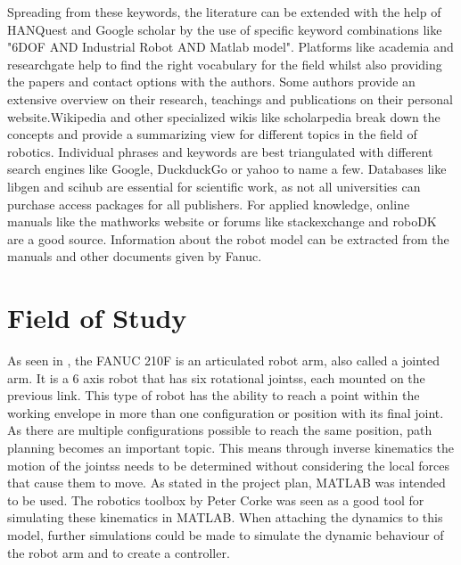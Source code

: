 Spreading from these keywords, the literature can be extended with the help of HANQuest and Google scholar by the use of specific keyword combinations like "6DOF AND Industrial Robot AND Matlab model". Platforms like academia and researchgate help to find the right vocabulary for the field whilst also providing the papers and contact options with the authors. 
Some authors provide an extensive overview on their research, teachings and publications on their personal website.​
Wikipedia and other specialized wikis like scholarpedia break down the concepts and provide a summarizing view for different topics in the field of robotics. Individual phrases and keywords are best triangulated with different search engines like Google, DuckduckGo or yahoo to name a few. Databases like libgen and scihub are essential for scientific work, as not all universities can purchase access packages for all publishers. For applied knowledge, online manuals like the mathworks website or forums like stackexchange and roboDK are a good source. Information about the robot model can be extracted from the manuals and other documents given by Fanuc.




\section{Field of Study}

As seen in %
\cite{IndustrialRobotArm}, the FANUC 210F is an articulated robot arm, also called a jointed arm. It is a 6 axis robot that has six rotational \glspl{joints}, each mounted on the previous \gls{link}. %
This type of robot has the ability to reach a point within the working envelope in more than one configuration or position with its final joint. 
As there are multiple configurations possible to reach the same position, path planning becomes an important topic. 
This means through inverse kinematics  the motion of the \glspl{joints} needs to be determined without considering the local forces that cause them to move.
As stated in the project plan, MATLAB was intended to be used.
The robotics toolbox by Peter Corke was seen as a good tool for simulating these kinematics in MATLAB. 
When attaching the dynamics to this model, further simulations could be made to simulate the dynamic behaviour of the robot arm and to create a controller. 

